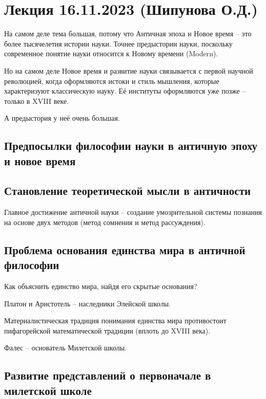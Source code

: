 \documentclass[main.tex]{subfiles}
\begin{document}
\section{Лекция 16.11.2023 (Шипунова О.Д.)}


На самом деле тема большая, потому что Античная эпоха и Новое время -- это более тысячелетия истории науки.
Точнее предыстории науки, поскольку современное понятие науки относится к Новому времени (Modern).

Но на самом деле Новое время и развитие науки связывается с первой научной революцией, когда оформляются истоки и стиль мышления, которые характеризуют классическую науку.
Её институты оформляются уже позже -- только в XVIII веке.

А предыстория у неё очень большая.

\subsection{Предпосылки философии науки в античную эпоху и новое время}


\subsection{Становление теоретической мысли в античности}


Главное достижение античной науки -- создание умозрительной системы познания на основе двух методов (метод сомнения и метод рассуждения).

\subsection{Проблема основания единства мира в античной философии}


Как объяснить единство мира, найдя его скрытые основания?

Платон и Аристотель -- наследники Элейской школы.

Материалистическая традиция понимания единства мира противостоит пифагорейской математической традиции (вплоть до XVIII века).

Фалес -- основатель Милетской школы.

\subsection{Развитие представлений о первоначале в милетской школе}
\end{document}
